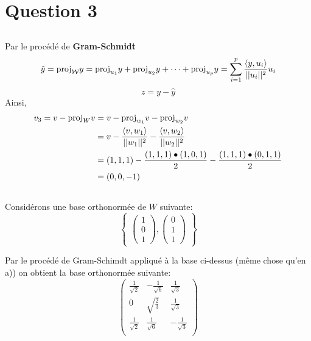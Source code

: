\section*{Question 3}
\subsection{}
Par le procédé de \textbf{Gram-Schmidt}
 \[\hat{y}=\text{\normalfont{proj}}_\mathcal{W} y=\text{\normalfont{proj}}_{u_1} y+\text{\normalfont{proj}}_{u_2} y+\dots+\text{\normalfont{proj}}_{u_p} y = \sum_{i=1}^{p} \frac{\langle y,u_i\rangle}{||u_i||^2} u_i\]
\[z=y-\hat{y}\]
Ainsi,
\[
\begin{split}
v_3=v-\text{\normalfont{proj}}_W v&=v-\text{\normalfont{proj}}_{w_1} v-\text{\normalfont{proj}}_{w_2} v\\
&= v-\frac{\langle v,w_1\rangle}{||w_1||^2}-\frac{\langle v,w_2\rangle}{||w_2||^2}\\
&= (1,1,1)-\frac{(1,1,1)\bullet(1,0,1)}{2}-\frac{(1,1,1)\bullet (0,1,1)}{2}\\
&= (0,0,-1)
\end{split}
\]
\subsection{}
Considérons une base orthonormée de $W$ suivante:
\[\begin{Bmatrix}
\begin{pmatrix}
1\\0\\1
\end{pmatrix},\begin{pmatrix}
0\\1\\1
\end{pmatrix}
\end{Bmatrix}\]

Par le procédé de Gram-Schimdt appliqué à la base ci-dessus (même chose qu'en a)) on obtient la base orthonormée suivante:
\[
\begin{pmatrix}
\frac{1}{\sqrt{2}} & -\frac{1}{\sqrt{6}} & \frac{1}{\sqrt{3}} \\
0 & \sqrt{\frac{2}{3}} & \frac{1}{\sqrt{3}} \\
\frac{1}{\sqrt{2}} & \frac{1}{\sqrt{6}} & -\frac{1}{\sqrt{3}} \\
\end{pmatrix}
\]
